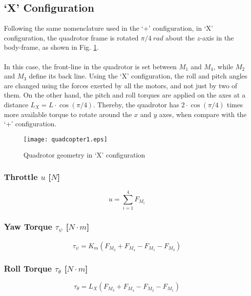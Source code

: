 \subsection{`X' Configuration}
Following the same nomenclature used in the `+' configuration, in `X' configuration, the quadrotor frame is rotated $\pi/4\ rad$ about the $z$-axis in the body-frame, as shown in Fig. \ref{fig:quadrotorX}. 
\\\\
In this case, the front-line in the quadrotor is set between $M_1$ and $M_4$, while $M_2$ and $M_3$ define its back line. Using the `X' configuration, the roll and pitch angles are changed using the forces exerted by all the motors, and not just by two of them. On the other hand, the pitch and roll torques are applied on the axes at a distance $L_X = L\cdot \cos(\pi/4)$. Thereby, the quadrotor has $2\cdot \cos(\pi/4)$ times more available torque to rotate around the $x$ and $y$ axes, when compare with the `+' configuration.

\begin{figure}[H]
\begin{center}
  \texttt{[image: quadcopter1.eps]}
\caption{Quadrotor geometry in `X' configuration} 
    \label{fig:quadrotorX}
    \end{center}
\end{figure}

\subsubsection{Throttle $u$ [$N$]}
\begin{equation}
u = \sum_{i=1}^{4}F_{M_i}
\end{equation}

\subsubsection{Yaw Torque $\tau_{\psi}$ [$N\cdot m$]}
\begin{equation}
\tau_{\psi} = K_{m}(F_{M_2} + F_{M_4} - F_{M_1} - F_{M_3})
\end{equation}

\subsubsection{Roll Torque $\tau_{\theta}$ [$N\cdot m$]}
\begin{equation}
\tau_{\theta} = L_{X}(F_{M_3}+F_{M_4}-F_{M_2}-F_{M_1})
\end{equation}

